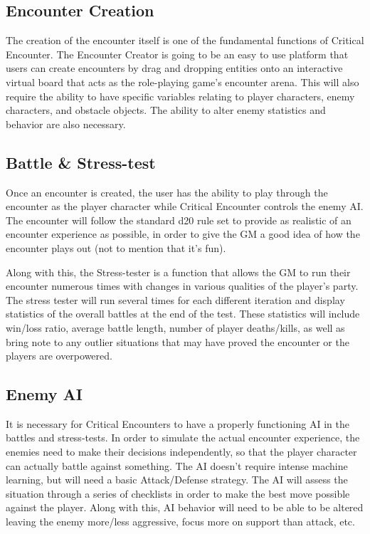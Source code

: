 \documentclass[12pt,a4paper]{report}
\begin{document}
		\subsection{Encounter Creation}
		The creation of the encounter itself is one of the fundamental functions of Critical Encounter. The Encounter Creator is going to be an easy to use platform that users can create encounters by drag and dropping entities onto an interactive virtual board that acts as the role-playing game's encounter arena. This will also require the ability to have specific variables relating to player characters, enemy characters, and obstacle objects. The ability to alter enemy statistics and behavior are also necessary.
		\subsection{Battle \& Stress-test}
		Once an encounter is created, the user has the ability to play through the encounter as the player character while Critical Encounter controls the enemy AI. The encounter will follow the standard d20 rule set to provide as realistic of an encounter experience as possible, in order to give the GM a good idea of how the encounter plays out (not to mention that it's fun).
		
		Along with this, the Stress-tester is a function that allows the GM to run their encounter numerous times with changes in various qualities of the player's party. The stress tester will run several times for each different iteration and display statistics of the overall battles at the end of the test. These statistics will include win/loss ratio, average battle length, number of player deaths/kills, as well as bring note to any outlier situations that may have proved the encounter or the players are overpowered.  
		\subsection{Enemy AI}
		It is necessary for Critical Encounters to have a properly functioning AI in the battles and stress-tests. In order to simulate the actual encounter experience, the enemies need to make their decisions independently, so that the player character can actually battle against something. The AI doesn't require intense machine learning, but will need a basic Attack/Defense strategy. The AI will assess the situation through a series of checklists in order to make the best move possible against the player. Along with this, AI behavior will need to be able to be altered leaving the enemy more/less aggressive, focus more on support than attack, etc.
\end{document}
